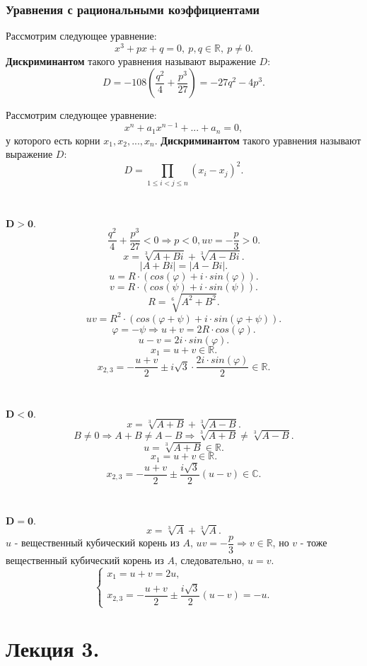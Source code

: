 \documentclass[12pt]{article}
\begin{document}
\subsubsection{Уравнения с рациональными коэффициентами}
\begin{defn}
Рассмотрим следующее уравнение: $$x^3 + px + q = 0,~p,q \in \mathbb{R},~p \neq 0.$$
\textbf{Дискриминантом} такого уравнения называют выражение $D$: $$D = -108(\dfrac{q^2}{4} + \dfrac{p^3}{27}) = -27q^2 - 4p^3.$$
\end{defn}

\begin{defn}
Рассмотрим следующее уравнение: $$x^n + a_1x^{n-1} + ... + a_n = 0,$$
у которого есть корни $x_1, x_2, ..., x_n$.
\textbf{Дискриминантом} такого уравнения называют выражение $D$: $$D = \prod_{1 \leq i < j \leq n }(x_i - x_j)^2.$$
\end{defn}

~\

$\pmb{D > 0.}$
$$\dfrac{q^2}{4} + \dfrac{p^3}{27} < 0 \Rightarrow p < 0, uv = -\dfrac{p}{3} > 0.$$
$$x = \sqrt[3]{A + Bi} + \sqrt[3]{A - Bi}.$$
$$|A + Bi| = |A - Bi|.$$
$$u = R \cdot (cos(\varphi) + i \cdot sin(\varphi)).$$
$$v = R \cdot (cos(\psi) + i \cdot sin(\psi)).$$
$$R = \sqrt[6]{A^2 + B^2}.$$
$$uv = R^2 \cdot (cos(\varphi + \psi) + i \cdot sin(\varphi + \psi)).$$
$$\varphi = -\psi \Rightarrow u + v = 2R \cdot cos(\varphi).$$
$$u - v = 2i \cdot sin(\varphi).$$
$$x_1 = u + v \in \mathbb{R}.$$
$$x_{2,3} = -\dfrac{u + v}{2} \pm i \sqrt{3} \cdot \dfrac{2i \cdot sin(\varphi)}{2} \in \mathbb{R}.$$

~\

$\pmb{D < 0.}$
$$x = \sqrt[3]{A + B}  + \sqrt[3]{A - B}.$$
$$B \neq 0 \Rightarrow A + B \neq A - B \Rightarrow \sqrt[3]{A + B} \neq \sqrt[3]{A - B}.$$
$$u = \sqrt[3]{A + B} \in \mathbb{R}.$$
$$x_1 = u + v \in \mathbb{R}.$$
$$x_{2, 3} = -\dfrac{u + v}{2} \pm \dfrac{i\sqrt{3}}{2}(u - v) \in \mathbb{C}.$$

~\

$\pmb{D = 0.}$
$$x = \sqrt[3]{A} + \sqrt[3]{A}.$$
\indent$u$ - вещественный кубический корень из $A$, $uv = -\dfrac{p}{3} \Rightarrow v \in \mathbb{R}$, но $v$ - тоже вещественный кубический корень из $A$, следовательно, $u = v$.
$$\begin{cases}
x_1 = u + v = 2u, \\
x_{2,3} = -\dfrac{u + v}{2} \pm \dfrac{i\sqrt{3}}{2}(u - v) = -u.
\end{cases}$$

\section{Лекция 3.}
\end{document}
